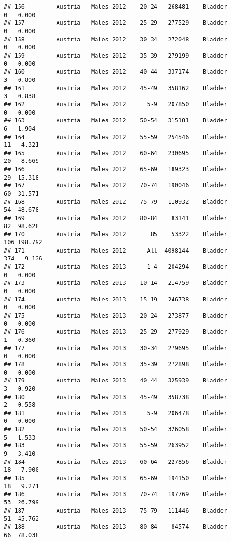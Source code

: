\documentclass[
]{article}
\begin{document}
\begin{verbatim}
## 156         Austria   Males 2012    20-24   268481    Bladder      0   0.000
## 157         Austria   Males 2012    25-29   277529    Bladder      0   0.000
## 158         Austria   Males 2012    30-34   272048    Bladder      0   0.000
## 159         Austria   Males 2012    35-39   279199    Bladder      0   0.000
## 160         Austria   Males 2012    40-44   337174    Bladder      3   0.890
## 161         Austria   Males 2012    45-49   358162    Bladder      3   0.838
## 162         Austria   Males 2012      5-9   207850    Bladder      0   0.000
## 163         Austria   Males 2012    50-54   315181    Bladder      6   1.904
## 164         Austria   Males 2012    55-59   254546    Bladder     11   4.321
## 165         Austria   Males 2012    60-64   230695    Bladder     20   8.669
## 166         Austria   Males 2012    65-69   189323    Bladder     29  15.318
## 167         Austria   Males 2012    70-74   190046    Bladder     60  31.571
## 168         Austria   Males 2012    75-79   110932    Bladder     54  48.678
## 169         Austria   Males 2012    80-84    83141    Bladder     82  98.628
## 170         Austria   Males 2012       85    53322    Bladder    106 198.792
## 171         Austria   Males 2012      All  4098144    Bladder    374   9.126
## 172         Austria   Males 2013      1-4   204294    Bladder      0   0.000
## 173         Austria   Males 2013    10-14   214759    Bladder      0   0.000
## 174         Austria   Males 2013    15-19   246738    Bladder      0   0.000
## 175         Austria   Males 2013    20-24   273877    Bladder      0   0.000
## 176         Austria   Males 2013    25-29   277929    Bladder      1   0.360
## 177         Austria   Males 2013    30-34   279695    Bladder      0   0.000
## 178         Austria   Males 2013    35-39   272898    Bladder      0   0.000
## 179         Austria   Males 2013    40-44   325939    Bladder      3   0.920
## 180         Austria   Males 2013    45-49   358738    Bladder      2   0.558
## 181         Austria   Males 2013      5-9   206478    Bladder      0   0.000
## 182         Austria   Males 2013    50-54   326058    Bladder      5   1.533
## 183         Austria   Males 2013    55-59   263952    Bladder      9   3.410
## 184         Austria   Males 2013    60-64   227856    Bladder     18   7.900
## 185         Austria   Males 2013    65-69   194150    Bladder     18   9.271
## 186         Austria   Males 2013    70-74   197769    Bladder     53  26.799
## 187         Austria   Males 2013    75-79   111446    Bladder     51  45.762
## 188         Austria   Males 2013    80-84    84574    Bladder     66  78.038

\end{verbatim}
\end{document}
